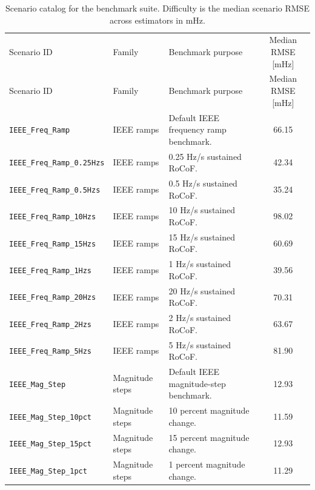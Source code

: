 \begin{longtable}{L{3.2cm} L{1.9cm} L{6.8cm} c}
\caption{Scenario catalog for the benchmark suite. Difficulty is the median scenario RMSE across estimators in mHz.}\label{tab:scenario_catalog}\\
\scriptsize\\
\toprule
Scenario ID & Family & Benchmark purpose & Median RMSE [mHz] \\
\midrule
\endfirsthead
\toprule
Scenario ID & Family & Benchmark purpose & Median RMSE [mHz] \\
\midrule
\endhead
\bottomrule
\endfoot
\texttt{IEEE\allowbreak\_Freq\allowbreak\_Ramp} & IEEE ramps & Default IEEE frequency ramp benchmark. & 66.15 \\
\texttt{IEEE\allowbreak\_Freq\allowbreak\_Ramp\allowbreak\_0.25Hzs} & IEEE ramps & 0.25 Hz/s sustained RoCoF. & 42.34 \\
\texttt{IEEE\allowbreak\_Freq\allowbreak\_Ramp\allowbreak\_0.5Hzs} & IEEE ramps & 0.5 Hz/s sustained RoCoF. & 35.24 \\
\texttt{IEEE\allowbreak\_Freq\allowbreak\_Ramp\allowbreak\_10Hzs} & IEEE ramps & 10 Hz/s sustained RoCoF. & 98.02 \\
\texttt{IEEE\allowbreak\_Freq\allowbreak\_Ramp\allowbreak\_15Hzs} & IEEE ramps & 15 Hz/s sustained RoCoF. & 60.69 \\
\texttt{IEEE\allowbreak\_Freq\allowbreak\_Ramp\allowbreak\_1Hzs} & IEEE ramps & 1 Hz/s sustained RoCoF. & 39.56 \\
\texttt{IEEE\allowbreak\_Freq\allowbreak\_Ramp\allowbreak\_20Hzs} & IEEE ramps & 20 Hz/s sustained RoCoF. & 70.31 \\
\texttt{IEEE\allowbreak\_Freq\allowbreak\_Ramp\allowbreak\_2Hzs} & IEEE ramps & 2 Hz/s sustained RoCoF. & 63.67 \\
\texttt{IEEE\allowbreak\_Freq\allowbreak\_Ramp\allowbreak\_5Hzs} & IEEE ramps & 5 Hz/s sustained RoCoF. & 81.90 \\
\texttt{IEEE\allowbreak\_Mag\allowbreak\_Step} & Magnitude steps & Default IEEE magnitude-step benchmark. & 12.93 \\
\texttt{IEEE\allowbreak\_Mag\allowbreak\_Step\allowbreak\_10pct} & Magnitude steps & 10 percent magnitude change. & 11.59 \\
\texttt{IEEE\allowbreak\_Mag\allowbreak\_Step\allowbreak\_15pct} & Magnitude steps & 15 percent magnitude change. & 12.93 \\
\texttt{IEEE\allowbreak\_Mag\allowbreak\_Step\allowbreak\_1pct} & Magnitude steps & 1 percent magnitude change. & 11.29 \\

\end{longtable}
